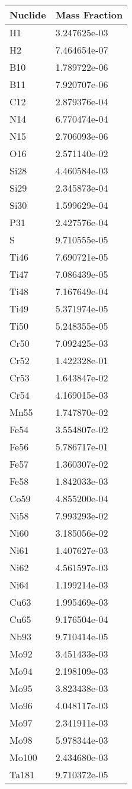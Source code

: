 \begin{centering}
\begin{longtable}[ht!]
{ p{} | p{} }
\hline
Nuclide & Mass Fraction\\
\hline
H1 & 3.247625e-03\\
H2 & 7.464654e-07\\
B10 & 1.789722e-06\\
B11 & 7.920707e-06\\
C12 & 2.879376e-04\\
N14 & 6.770474e-04\\
N15 & 2.706093e-06\\
O16 & 2.571140e-02\\
Si28 & 4.460584e-03\\
Si29 & 2.345873e-04\\
Si30 & 1.599629e-04\\
P31 & 2.427576e-04\\
S & 9.710555e-05\\
Ti46 & 7.690721e-05\\
Ti47 & 7.086439e-05\\
Ti48 & 7.167649e-04\\
Ti49 & 5.371974e-05\\
Ti50 & 5.248355e-05\\
Cr50 & 7.092425e-03\\
Cr52 & 1.422328e-01\\
Cr53 & 1.643847e-02\\
Cr54 & 4.169015e-03\\
Mn55 & 1.747870e-02\\
Fe54 & 3.554807e-02\\
Fe56 & 5.786717e-01\\
Fe57 & 1.360307e-02\\
Fe58 & 1.842033e-03\\
Co59 & 4.855200e-04\\
Ni58 & 7.993293e-02\\
Ni60 & 3.185056e-02\\
Ni61 & 1.407627e-03\\
Ni62 & 4.561597e-03\\
Ni64 & 1.199214e-03\\
Cu63 & 1.995469e-03\\
Cu65 & 9.176504e-04\\
Nb93 & 9.710414e-05\\
Mo92 & 3.451433e-03\\
Mo94 & 2.198109e-03\\
Mo95 & 3.823438e-03\\
Mo96 & 4.048117e-03\\
Mo97 & 2.341911e-03\\
Mo98 & 5.978344e-03\\
Mo100 & 2.434680e-03\\
Ta181 & 9.710372e-05\\


\end{longtable}
\end{centering}
